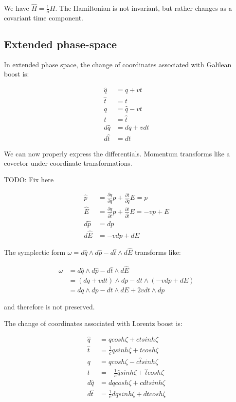\documentclass[aps,pra,10pt,twocolumn,floatfix,nofootinbib]{revtex4-1}
\theoremstyle{definition}
\begin{document}
We have $\hat{H}= \frac{1}{a}H$. The Hamiltonian is not invariant, but rather changes as a covariant time component.

\subsection{Extended phase-space}

In extended phase space, the change of coordinates associated with Galilean boost is:

\begin{align*}
\hat{q} &= q + vt \\
\hat{t} &= t \\
q &= \hat{q} - vt \\
t &= \hat{t} \\
d\hat{q} &= dq + v dt \\
d\hat{t} &= dt
\end{align*}

We can now properly express the differentials. Momentum transforms like a covector under coordinate transformations.

TODO: Fix here

\begin{align*}
\hat{p} &= \frac{\partial q}{\partial \hat{q}} p + \frac{\partial t}{\partial \hat{q}} E = p \\
\hat{E} &= \frac{\partial q}{\partial \hat{t}} p + \frac{\partial t}{\partial \hat{t}} E = -vp + E \\
d \hat{p} &= dp \\
d \hat{E} &= -v dp + dE
\end{align*}

The symplectic form $\omega = d\hat{q} \wedge d\hat{p} - d\hat{t} \wedge d\hat{E}$ transforms like:

\begin{align*}
\omega &= d\hat{q} \wedge d\hat{p} - d\hat{t} \wedge d\hat{E} \\
&= (dq + v dt) \wedge dp - dt \wedge (-v dp + dE)\\
&= dq \wedge dp - dt \wedge dE + 2v dt \wedge dp
\end{align*}

and therefore is not preserved.

The change of coordinates associated with Lorentz boost is:

\begin{align*}
\hat{q} &= q cosh \zeta  + ct sinh \zeta  \\
\hat{t} &= \frac{1}{c} q sinh \zeta + t cosh \zeta \\
q &= \hat{q} cosh \zeta - c\hat{t} sinh \zeta \\
t &= - \frac{1}{c} \hat{q} sinh \zeta + \hat{t} cosh \zeta \\
d\hat{q} &= dq cosh \zeta  + cdt sinh \zeta \\
d\hat{t} &= \frac{1}{c} dq sinh \zeta + dt cosh \zeta
\end{align*}
\end{document}

